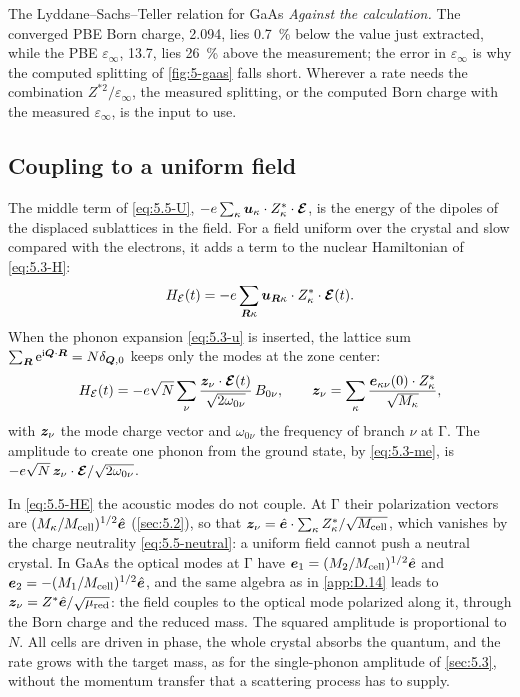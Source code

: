 \begin{workedexample}{The Lyddane--Sachs--Teller relation for GaAs}
\emph{Against the calculation.} The converged PBE Born charge, 2.094, lies \SI{0.7}{\percent} below the value just extracted, while the PBE $\varepsilon_\infty$, 13.7, lies \SI{26}{\percent} above the measurement; the error in $\varepsilon_\infty$ is why the computed splitting of \cref{fig:5-gaas} falls short. Wherever a rate needs the combination $Z^{*2}/\varepsilon_\infty$, the measured splitting, or the computed Born charge with the measured $\varepsilon_\infty$, is the input to use.
\end{workedexample}

\subsection{Coupling to a uniform field}

The middle term of \cref{eq:5.5-U}, $-e\sum_\kappa\bm{u}_\kappa\cdot Z^*_\kappa\cdot\bm{\mathcal{E}}$, is the energy of the dipoles of the displaced sublattices in the field. For a field uniform over the crystal and slow compared with the electrons, it adds a term to the nuclear Hamiltonian of \cref{eq:5.3-H}:
\begin{equation*}
  H_{\mathcal{E}}(t) = -e\sum_{\bm{R}\kappa}\bm{u}_{\bm{R}\kappa}\cdot Z^*_\kappa\cdot\bm{\mathcal{E}}(t) .
\end{equation*}
When the phonon expansion \cref{eq:5.3-u} is inserted, the lattice sum $\sum_{\bm{R}}\mathrm{e}^{\mathrm{i}\bm{Q}\cdot\bm{R}} = N\delta_{\bm{Q},0}$ keeps only the modes at the zone center:
\begin{equation}
  H_{\mathcal{E}}(t) = -e\sqrt{N}\sum_\nu\frac{\bm{z}_\nu\cdot\bm{\mathcal{E}}(t)}{\sqrt{2\omega_{0\nu}}}\,B_{0\nu} ,
  \qquad
  \bm{z}_\nu = \sum_\kappa\frac{\bm{e}_{\kappa\nu}(0)\cdot Z^*_\kappa}{\sqrt{M_\kappa}} ,
  \label{eq:5.5-HE}
\end{equation}
with $\bm{z}_\nu$ the mode charge vector and $\omega_{0\nu}$ the frequency of branch $\nu$ at $\mathrm{\Gamma}$. The amplitude to create one phonon from the ground state, by \cref{eq:5.3-me}, is $-e\sqrt N\,\bm{z}_\nu\cdot\bm{\mathcal{E}}/\sqrt{2\omega_{0\nu}}$.

In \cref{eq:5.5-HE} the acoustic modes do not couple. At $\mathrm{\Gamma}$ their polarization vectors are $(M_\kappa/M_{\mathrm{cell}})^{1/2}\hat{\bm{e}}$ (\cref{sec:5.2}), so that $\bm{z}_\nu = \hat{\bm{e}}\cdot\sum_\kappa Z^*_\kappa/\sqrt{M_{\mathrm{cell}}}$, which vanishes by the charge neutrality \cref{eq:5.5-neutral}: a uniform field cannot push a neutral crystal. In GaAs the optical modes at $\mathrm{\Gamma}$ have $\bm{e}_{1} = (M_2/M_{\mathrm{cell}})^{1/2}\hat{\bm{e}}$ and $\bm{e}_{2} = -(M_1/M_{\mathrm{cell}})^{1/2}\hat{\bm{e}}$, and the same algebra as in \cref{app:D.14} leads to $\bm{z}_\nu = Z^*\hat{\bm{e}}/\sqrt{\mu_{\mathrm{red}}}$: the field couples to the optical mode polarized along it, through the Born charge and the reduced mass. The squared amplitude is proportional to $N$. All cells are driven in phase, the whole crystal absorbs the quantum, and the rate grows with the target mass, as for the single-phonon amplitude of \cref{sec:5.3}, without the momentum transfer that a scattering process has to supply.

